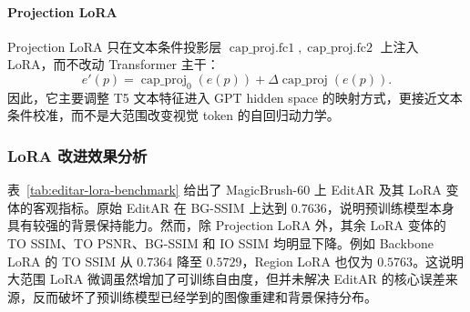 \paragraph{Projection LoRA}
Projection LoRA 只在文本条件投影层 \(\operatorname{cap\_proj.fc1},\operatorname{cap\_proj.fc2}\) 上注入 LoRA，而不改动 Transformer 主干：
\[
e'(p)=\operatorname{cap\_proj}_{0}(e(p))
+\Delta\operatorname{cap\_proj}(e(p)).
\]
因此，它主要调整 T5 文本特征进入 GPT hidden space 的映射方式，更接近文本条件校准，而不是大范围改变视觉 token 的自回归动力学。

\begin{table}[t]
\centering
\small
\caption{MagicBrush-60 上 EditAR 及其 LoRA 变体的客观指标。TO 表示 Target--Output，IO 表示 Input--Output；Edit Chg. 为编辑区域平均亮度变化。}
\label{tab:editar-lora-benchmark}
\end{table}

\subsubsection{LoRA 改进效果分析}

表~\ref{tab:editar-lora-benchmark} 给出了 MagicBrush-60 上 EditAR 及其 LoRA 变体的客观指标。原始 EditAR 在 BG-SSIM 上达到 \(0.7636\)，说明预训练模型本身具有较强的背景保持能力。然而，除 Projection LoRA 外，其余 LoRA 变体的 TO SSIM、TO PSNR、BG-SSIM 和 IO SSIM 均明显下降。例如 Backbone LoRA 的 TO SSIM 从 \(0.7364\) 降至 \(0.5729\)，Region LoRA 也仅为 \(0.5763\)。这说明大范围 LoRA 微调虽然增加了可训练自由度，但并未解决 EditAR 的核心误差来源，反而破坏了预训练模型已经学到的图像重建和背景保持分布。

